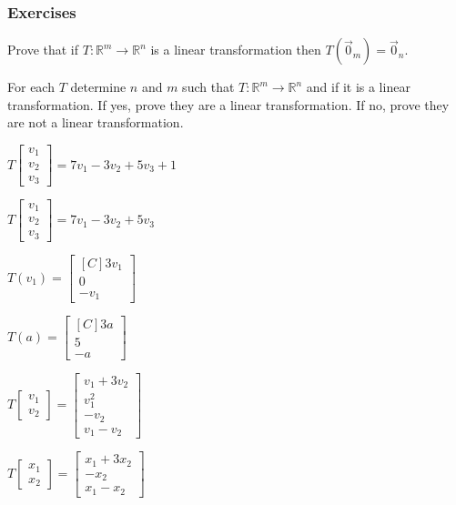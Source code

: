 \subsubsection{Exercises} \relax
\begin{exercise}
Prove that if $T: \mathbb{R}^m \to \mathbb{R}^n$ is a linear transformation then $T(\vec{0}_m)=\vec{0}_n$.
\end{exercise}

\begin{exercise}
For each $T$ determine $n$ and $m$ such that $T:\mathbb{R}^m \to \mathbb{R}^n$ and if it is a linear transformation. If yes, prove they are a linear transformation. If no, prove they are not a linear transformation.\\
\begin{inparaenum}[a)]
\item $T\begin{bmatrix} v_1 \\ v_2 \\ v_3 \end{bmatrix} = 7v_1-3v_2+5v_3+1$ \hfill 
\item $T\begin{bmatrix} v_1 \\ v_2 \\ v_3 \end{bmatrix} = 7v_1-3v_2+5v_3$ \hfill {} \\
\item $T(v_1)=\begin{bmatrix*}[C]3v_1 \\ 0 \\ -v_1 \end{bmatrix*}$ \hfill
\item $T(a)=\begin{bmatrix*}[C]3a \\ 5 \\ -a \end{bmatrix*}$ \hfill {} \\
\item $T\begin{bmatrix} v_1 \\ v_2 \end{bmatrix}=\begin{bmatrix}v_1+3v_2 \\ v_1^2 \\ -v_2 \\ v_1-v_2\end{bmatrix}$ \hfill
\item $T\begin{bmatrix} x_1 \\ x_2 \end{bmatrix}=\begin{bmatrix}x_1+3x_2 \\ -x_2 \\ x_1-x_2\end{bmatrix}$ \hfill {} \\

\end{inparaenum}
\end{exercise}
